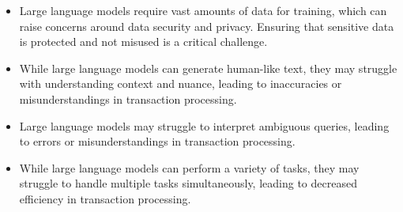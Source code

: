\begin{itemize}
    \item Large language models require vast amounts of data for training, which can raise concerns around data security and privacy. Ensuring that sensitive data is protected and not misused is a critical challenge.

    \item While large language models can generate human-like text, they may struggle with understanding context and nuance, leading to inaccuracies or misunderstandings in transaction processing.
    
    \item Large language models may struggle to interpret ambiguous queries, leading to errors or misunderstandings in transaction processing.

    \item  While large language models can perform a variety of tasks, they may struggle to handle multiple tasks simultaneously, leading to decreased efficiency in transaction processing.
\end{itemize} 